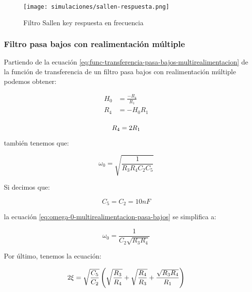 \begin{figure}[ht]
    \centering
    \texttt{[image: simulaciones/sallen-respuesta.png]}
    \caption{Filtro Sallen key respuesta en frecuencia  }
\end{figure}

\FloatBarrier
\subsubsection{Filtro pasa bajos con realimentación múltiple}

Partiendo de la ecuación \ref{eq:func-transferencia-pasa-bajos-multirealimentacion} de la función de transferencia de un filtro pasa bajos con realimentación múltiple podemos obtener:

\begin{align*}
    H_0 &= \frac{-R_4}{R_1} \\
    R_4 &= - H_0 R_1 \\
\end{align*}

\begin{equation}
    R_4 = 2 R_1\\
    \label{eq:r4-multirealimentacion-pasa-bajos}
\end{equation}

también tenemos que: 

\begin{equation}
    \omega_0 = \sqrt{\frac{1}{R_3 R_4 C_2 C_5}}
    \label{eq:omega-0-multirealimentacion-pasa-bajos}
\end{equation}

Si decimos que: 

\begin{equation*}
    \boxed{C_5 = C_2 = 10nF}
\end{equation*}

la ecuación \ref{eq:omega-0-multirealimentacion-pasa-bajos} se simplifica a:

\begin{equation}
    \omega_0 = \frac{1}{C_2\sqrt{R_3 R_4}}
    \label{eq:omega-0-multirealimentacion-pasa-bajos-simple}
\end{equation}

Por último, tenemos la ecuación:

\begin{equation}
    2\xi = \sqrt{\frac{C_5}{C_2}} \left( \sqrt{\frac{R_3}{R_4}} + \sqrt{\frac{R_4}{R_3}} + \frac{\sqrt{R_3 R_4}}{R_1} \right)
    \label{eq:factor-amortiguamiento-multirealimentacion-pasa-bajos}
\end{equation}



